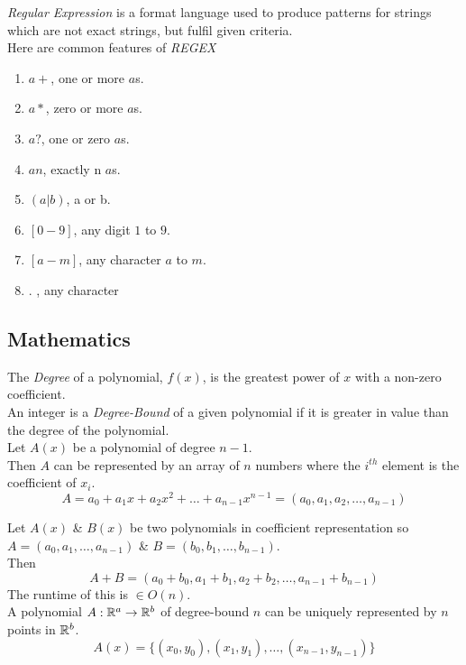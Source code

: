 \documentclass[11pt,a4paper]{article}
\begin{document}
\textit{Regular Expression} is a format language used to produce patterns for strings which are not exact strings, but fulfil given criteria.\\
Here are common features of \textit{REGEX}
\begin{enumerate}[label=-]
  \item $a+$, one or more $a$s.
  \item $a*$, zero or more $a$s.
  \item $a?$, one or zero $a$s.
  \item $a{n}$, exactly n $a$s.
  \item $(a|b)$, a or b.
  \item $[0-9]$, any digit $1$ to $9$.
  \item $[a-m]$, any character $a$ to $m$.
  \item $.$ , any character
\end{enumerate}

\subsection{Mathematics}

The \textit{Degree} of a polynomial, $f(x)$, is the greatest power of $x$ with a non-zero coefficient.\\

An integer is a \textit{Degree-Bound} of a given polynomial if it is greater in value than the degree of the polynomial.\\

Let $A(x)$ be a polynomial of degree $n-1$.\\
Then $A$ can be represented by an array of $n$ numbers where the $i^{th}$ element is the coefficient of $x_i$.\\
$$A=a_0+a_1x+a_2x^2+\dots+a_{n-1}x^{n-1}=(a_0,a_1,a_2,\dots,a_{n-1})$$

Let $A(x)$ \& $B(x)$ be two polynomials in coefficient representation so $A=(a_0, a_1, \dots,a_{n-1})$ \& $B=(b_0, b_1,\dots,b_{n-1})$.\\
Then
$$A+B=(a_0+b_0,a_1+b_1,a_2+b_2,\dots,a_{n-1}+b_{n-1})$$
\nb The runtime of this is $\in O(n)$.\\

A polynomial $A:\mathbb{R}^a\to\mathbb{R}^b$ of degree-bound $n$ can be uniquely represented by $n$ points in $\mathbb{R}^b$.
$$A(x)=\{(x_0, y_0),(x_1, y_1),\dots,(x_{n-1}, y_{n-1})\}$$
\end{document}
